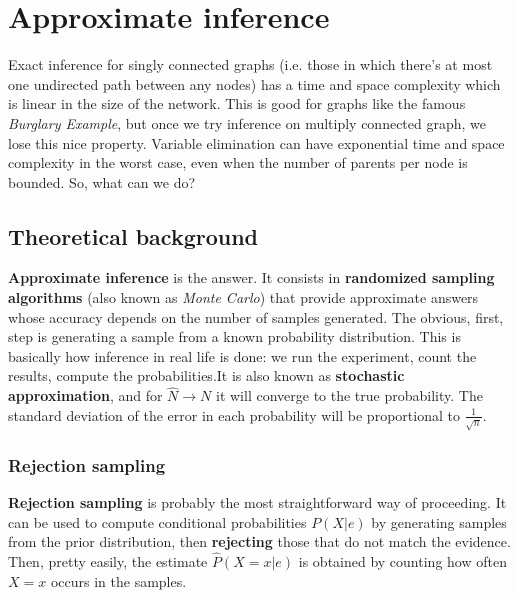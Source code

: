 \section{Approximate inference}
\label{sec:approxinference}
Exact inference for singly connected graphs (i.e. those in which there's at most one undirected path between any nodes) has a time and space complexity which is linear in the size of the network. This is good for graphs like the famous \textit{Burglary Example}, but once we try inference on multiply connected graph, we lose this nice property. Variable elimination can have exponential time and space complexity in the worst case, even when the number of parents per node is bounded. \cite{russel2010} So, what can we do? 
\subsection{Theoretical background}
\textbf{Approximate inference} is the answer. It consists in \textbf{randomized sampling algorithms} (also known as \textit{Monte Carlo}) that provide approximate answers whose accuracy depends on the number of samples generated. The obvious, first, step is generating a sample from a known probability distribution. This is basically how inference in real life is done: we run the experiment, count the results, compute the probabilities.It is also known as \textbf{stochastic approximation}, and for $\hat{N}\rightarrow N$ it will converge to the true probability. The standard deviation of the error in each probability will be proportional to $\frac{1}{\sqrt{n}}$.
\subsubsection{Rejection sampling}
\textbf{Rejection sampling} is probably the most straightforward way of proceeding. It can be used to compute conditional probabilities $P(X|e)$ by generating samples from the prior distribution, then \textbf{rejecting} those that do not match the evidence. Then, pretty easily, the estimate $\hat{P}(X=x|e)$ is obtained by counting how often $X=x$ occurs in the samples.
